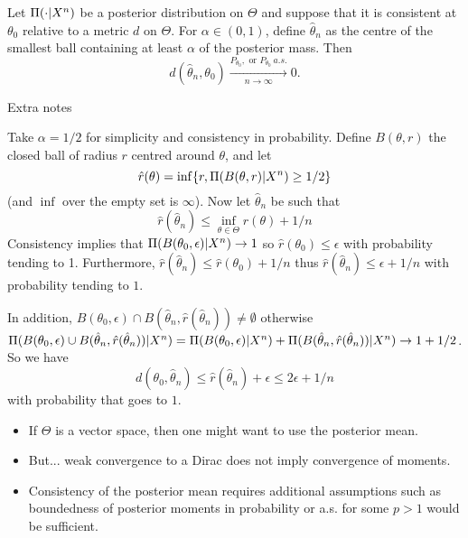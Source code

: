 \begin{theorem}
Let $\Pi(\cdot|X^n)$ be a posterior distribution on $\Theta$ and suppose that it is consistent at $\theta_0$ relative to a metric $d$ on $\Theta$. For $\alpha \in (0,1)$, define $\hat{\theta}_n$ as the centre of the smallest ball containing at least $\alpha$ of the posterior mass. Then 
$$
d(\hat{\theta}_n, \theta_0) \xrightarrow[n\to \infty]{P_{\theta_0}, \text{ or } P_{\theta_0}~a.s. } 0. 
$$   
\end{theorem}









{Extra notes}

	Take $\alpha = 1/2$ for simplicity and consistency in probability. Define $B(\theta,r)$ the closed ball of radius $r$ centred around $\theta$, and let 
	$$
\hat{r}(\theta) = \inf\{r, \Pi(B(\theta,r) | X^n)\geq 1/2  \}
	$$
	(and $\inf$ over the empty set is $\infty$). Now let $\hat{\theta}_n$ be such that 
	$$
\hat{r}(\hat{\theta}_n) \leq \inf_{\theta \in \Theta} r(\theta) + 1/n
	$$ 
	Consistency implies that $\Pi(B(\theta_0,\epsilon) |X^n) \to 1$ so $\hat{r}(\theta_0) \leq \epsilon$ with probability tending to 1. Furthermore, $\hat{r}(\hat{\theta}_n)  \leq \hat{r}(\theta_0) + 1/n $ thus $\hat{r}(\hat{\theta}_n)  \leq \epsilon + 1/n$ with probability tending to $1$.
 
	In addition, $B(\theta_0,\epsilon)\cap B(\hat{\theta}_n,\hat{r}(\hat{\theta}_n)) \neq \emptyset$ otherwise $\Pi(B(\theta_0,\epsilon)\cup B(\hat{\theta}_n,\hat{r}(\hat{\theta}_n)) |X^n) = \Pi(B(\theta_0,\epsilon)|X^n) + \Pi(B(\hat{\theta}_n,\hat{r}(\hat{\theta}_n)) |X^n) \to 1 + 1/2$. So we have 
	$$
d(\theta_0,\hat{\theta}_n) \leq \hat{r}(\hat{\theta}_n) + \epsilon \leq 2\epsilon + 1/n
	$$
	with probability that goes to $1$. 




\begin{itemize}
\item If $\Theta$ is a vector space, then one might want to use the \alert{posterior mean}.
\item But... weak convergence to a Dirac does not imply convergence of moments.
\item Consistency of the posterior mean requires additional assumptions such as boundedness of posterior moments in probability or a.s. for some $p>1$ would be sufficient. 
\end{itemize}






